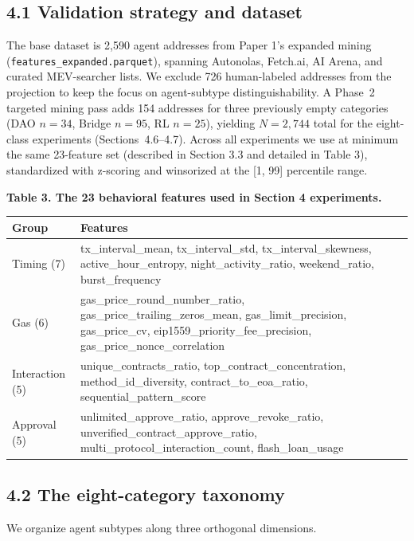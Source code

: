 \documentclass[sigconf,nonacm=false]{acmart}
\begin{document}
\subsection{4.1 Validation strategy and dataset}

The base dataset is 2,590 agent addresses from Paper 1's expanded mining (\texttt{features\_expanded.parquet}), spanning Autonolas, Fetch.ai, AI Arena, and curated MEV-searcher lists. We exclude 726 human-labeled addresses from the projection to keep the focus on agent-subtype distinguishability. A Phase~2 targeted mining pass adds 154 addresses for three previously empty categories (DAO $n{=}34$, Bridge $n{=}95$, RL $n{=}25$), yielding $N = 2{,}744$ total for the eight-class experiments (Sections~4.6--4.7). Across all experiments we use at minimum the same 23-feature set (described in Section 3.3 and detailed in Table 3), standardized with z-scoring and winsorized at the [1, 99] percentile range.

\textbf{Table 3. The 23 behavioral features used in Section 4 experiments.}

\begin{table}[h]
\centering
\small
\begin{tabular}{ll}
\toprule
Group & Features \\
\midrule
Timing (7) & tx\_interval\_mean, tx\_interval\_std, tx\_interval\_skewness, active\_hour\_entropy, night\_activity\_ratio, weekend\_ratio, burst\_frequency \\
Gas (6) & gas\_price\_round\_number\_ratio, gas\_price\_trailing\_zeros\_mean, gas\_limit\_precision, gas\_price\_cv, eip1559\_priority\_fee\_precision, gas\_price\_nonce\_correlation \\
Interaction (5) & unique\_contracts\_ratio, top\_contract\_concentration, method\_id\_diversity, contract\_to\_eoa\_ratio, sequential\_pattern\_score \\
Approval (5) & unlimited\_approve\_ratio, approve\_revoke\_ratio, unverified\_contract\_approve\_ratio, multi\_protocol\_interaction\_count, flash\_loan\_usage \\
\bottomrule
\end{tabular}
\end{table}

\subsection{4.2 The eight-category taxonomy}

We organize agent subtypes along three orthogonal dimensions.
\end{document}
